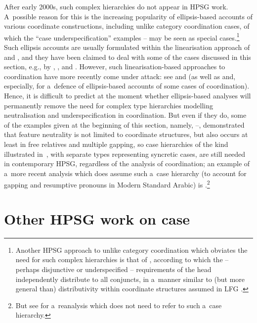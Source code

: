 \documentclass[output=paper]{langsci/langscibook}
\begin{document}
After early 2000s, such complex  hierarchies do not appear in HPSG work.  A~possible reason for this is the increasing popularity of ellipsis-based accounts of various coordinate constructions, including unlike category coordination cases, of which the “case underspecification” examples – may be seen as special cases.\footnote{Another HPSG approach to unlike category coordination which obviates the need for such complex hierarchies is that of \citealt{yata:04}, according to which the – perhaps disjunctive or underspecified – requirements of the head independently distribute to all conjuncts, in a~manner similar to (but more general than) distributivity within coordinate structures assumed in LFG \citep{DK2000a,dal:kin:sad:09,prz:pat:12a}.}  Such ellipsis accounts are usually formulated within the linearisation approach of \citealt{Reape92a,Reape94a} and \citealt{Kathol95a}, and they have been claimed to deal with some of the cases discussed in this section, e.g., by \citealt{Crysmann2003c}, \citealt{BS2004a}, and \citealt{chav:06,chav:08}.  However, such linearisation-based approaches to coordination have more recently come under attack: see \citealt{levi:11} and \citealt{kub:lev:15} (as well as \citealt{yata:12,yata:16} and, especially, \citealt{yat:wai:18} for a~defence of ellipsis-based accounts of some cases of coordination).  Hence, it is difficult to predict at the moment whether ellipsis-based analyses will permanently remove the need for complex type hierarchies modelling neutralisation and underspecification in coordination.  But even if they do, some of the examples given at the beginning of this section, namely, –, demonstrated that feature neutrality is not limited to coordinate structures, but also occurs at least in free relatives and multiple gapping, so case hierarchies of the kind illustrated in~, with separate types representing syncretic cases, are still needed in contemporary HPSG, regardless of the analysis of coordination; an example of a~more recent analysis which does assume such a~case hierarchy (to account for gapping and resumptive pronouns in Modern Standard Arabic) is \citealt{AB2013a-u}.\footnote{But see \citealt{crys:17} for a~reanalysis which does not need to refer to such a~case hierarchy.}



\section{Other HPSG work on case}
\label{sec:case:other}
\end{document}
